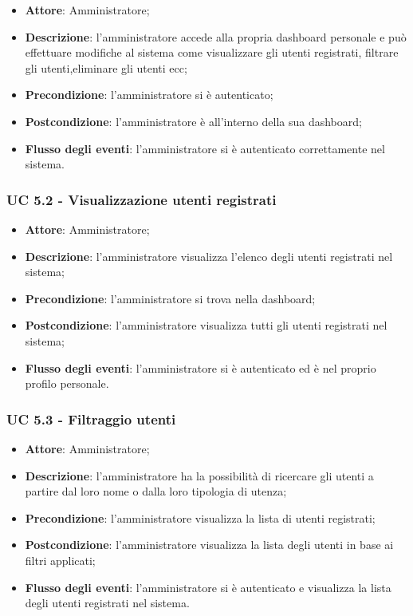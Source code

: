 \begin{itemize}
\item \textbf{Attore}: Amministratore; 
\item \textbf{Descrizione}: l'amministratore accede alla propria dashboard personale e può effettuare modifiche al sistema come  visualizzare gli utenti registrati, filtrare gli utenti,eliminare gli utenti ecc;
\item \textbf{Precondizione}: l'amministratore si è autenticato;
\item \textbf{Postcondizione}: l'amministratore è all'interno della sua dashboard;
\item \textbf{Flusso degli eventi}: l'amministratore si è autenticato correttamente nel sistema.
\end{itemize}

\subsubsection{UC 5.2 - Visualizzazione utenti registrati}

\begin{itemize}
\item \textbf{Attore}: Amministratore;
\item \textbf{Descrizione}: l'amministratore visualizza l'elenco degli utenti registrati nel sistema;
\item \textbf{Precondizione}: l'amministratore si trova nella dashboard;
\item \textbf{Postcondizione}: l'amministratore visualizza tutti gli utenti registrati nel sistema;
\item \textbf{Flusso degli eventi}: l'amministratore si è autenticato ed è nel proprio profilo personale.
\end{itemize}

\subsubsection{UC 5.3 - Filtraggio utenti}
\begin{itemize}
\item \textbf{Attore}: Amministratore;
\item \textbf{Descrizione}: l'amministratore ha la possibilità di ricercare gli utenti a partire dal loro nome o dalla loro tipologia di utenza;
\item \textbf{Precondizione}: l'amministratore visualizza la lista di utenti registrati;
\item \textbf{Postcondizione}: l'amministratore visualizza la lista degli utenti in base ai filtri applicati;
\item \textbf{Flusso degli eventi}: l'amministratore si è autenticato e visualizza la lista degli utenti registrati nel sistema.
\end{itemize}

